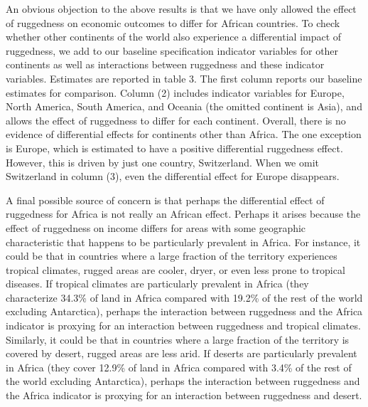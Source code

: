 \documentclass[
  letterpaper,
  DIV=11,
  numbers=noendperiod]{scrartcl}
\begin{document}
An obvious objection to the above results is that we have only allowed
the effect of ruggedness on economic outcomes to differ for African
countries. To check whether other continents of the world also
experience a differential impact of ruggedness, we add to our baseline
specification indicator variables for other continents as well as
interactions between ruggedness and these indicator variables. Estimates
are reported in table 3. The first column reports our baseline estimates
for comparison. Column (2) includes indicator variables for Europe,
North America, South America, and Oceania (the omitted continent is
Asia), and allows the effect of ruggedness to differ for each continent.
Overall, there is no evidence of differential effects for continents
other than Africa. The one exception is Europe, which is estimated to
have a positive differential ruggedness effect. However, this is driven
by just one country, Switzerland. When we omit Switzerland in column
(3), even the differential effect for Europe disappears.

A final possible source of concern is that perhaps the differential
effect of ruggedness for Africa is not really an African effect. Perhaps
it arises because the effect of ruggedness on income differs for areas
with some geographic characteristic that happens to be particularly
prevalent in Africa. For instance, it could be that in countries where a
large fraction of the territory experiences tropical climates, rugged
areas are cooler, dryer, or even less prone to tropical diseases. If
tropical climates are particularly prevalent in Africa (they
characterize 34.3\% of land in Africa compared with 19.2\% of the rest
of the world excluding Antarctica), perhaps the interaction between
ruggedness and the Africa indicator is proxying for an interaction
between ruggedness and tropical climates. Similarly, it could be that in
countries where a large fraction of the territory is covered by desert,
rugged areas are less arid. If deserts are particularly prevalent in
Africa (they cover 12.9\% of land in Africa compared with 3.4\% of the
rest of the world excluding Antarctica), perhaps the interaction between
ruggedness and the Africa indicator is proxying for an interaction
between ruggedness and desert.
\end{document}
